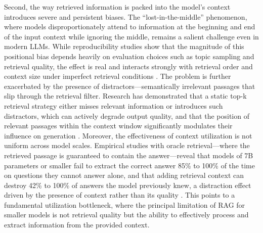 \documentclass[11pt]{article}
\begin{document}
Second, the way retrieved information is packed into the model's context introduces severe and persistent biases. The ``lost-in-the-middle'' phenomenon, where models disproportionately attend to information at the beginning and end of the input context while ignoring the middle, remains a salient challenge even in modern LLMs. While reproducibility studies show that the magnitude of this positional bias depends heavily on evaluation choices such as topic sampling and retrieval quality, the effect is real and interacts strongly with retrieval order and context size under imperfect retrieval conditions \cite{ref598}. The problem is further exacerbated by the presence of distractors---semantically irrelevant passages that slip through the retrieval filter. Research has demonstrated that a static top-k retrieval strategy either misses relevant information or introduces such distractors, which can actively degrade output quality, and that the position of relevant passages within the context window significantly modulates their influence on generation \cite{ref155}. Moreover, the effectiveness of context utilization is not uniform across model scales. Empirical studies with oracle retrieval---where the retrieved passage is guaranteed to contain the answer---reveal that models of 7B parameters or smaller fail to extract the correct answer 85\% to 100\% of the time on questions they cannot answer alone, and that adding retrieval context can destroy 42\% to 100\% of answers the model previously knew, a distraction effect driven by the presence of context rather than its quality \cite{ref599}. This points to a fundamental utilization bottleneck, where the principal limitation of RAG for smaller models is not retrieval quality but the ability to effectively process and extract information from the provided context.
\end{document}
